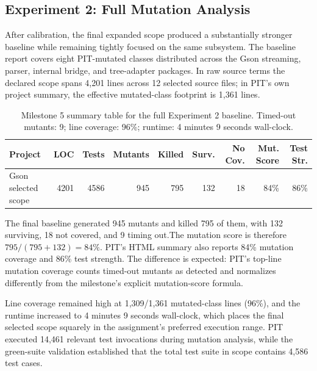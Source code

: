 \documentclass[11pt]{article}
\begin{document}
\subsection{Experiment 2: Full Mutation Analysis}
After calibration, the final expanded scope produced a substantially stronger baseline while remaining tightly focused on the same subsystem. The baseline report covers eight PIT-mutated classes distributed across the Gson streaming, parser, internal bridge, and tree-adapter packages. In raw source terms the declared scope spans 4,201 lines across 12 selected source files; in PIT's own project summary, the effective mutated-class footprint is 1,361 lines.

\begin{table}[H]
\centering
\small
\begin{tabular}{lrrrrrrrr}
\toprule
Project & LOC & Tests & Mutants & Killed & Surv. & No Cov. & Mut. Score & Test Str. \\
\midrule
Gson selected scope & 4201 & 4586 & 945 & 795 & 132 & 18 & 84\% & 86\% \\
\bottomrule
\end{tabular}
\caption{Milestone 5 summary table for the full Experiment 2 baseline. Timed-out mutants: 9; line coverage: 96\%; runtime: 4 minutes 9 seconds wall-clock.}
\end{table}

The final baseline generated 945 mutants and killed 795 of them, with 132 surviving, 18 not covered, and 9 timing out.The mutation score is therefore $795 / (795 + 132) = 84\%$. PIT's HTML summary also reports 84\% mutation coverage and 86\% test strength. The difference is expected: PIT's top-line mutation coverage counts timed-out mutants as detected and normalizes differently from the milestone's explicit mutation-score formula.

Line coverage remained high at 1,309/1,361 mutated-class lines (96\%), and the runtime increased to 4 minutes 9 seconds wall-clock, which places the final selected scope squarely in the assignment's preferred execution range. PIT executed 14,461 relevant test invocations during mutation analysis, while the green-suite validation established that the total test suite in scope contains 4,586 test cases.
\end{document}
